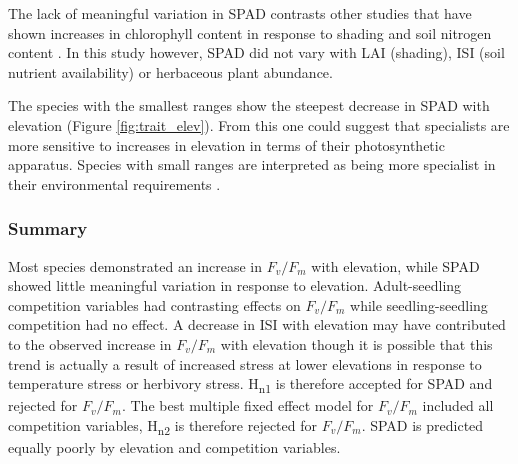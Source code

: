 \documentclass[a4paper,11pt]{article}
\begin{document}
The lack of meaningful variation in SPAD contrasts other studies that have shown increases in chlorophyll content in response to shading \citep{Brand1997, Rijkers2000, Rozendaal2006, Dai2009, Zervoudakis2012} and soil nitrogen content \citep{Cechin2004}. In this study however, SPAD did not vary with LAI (shading), ISI (soil nutrient availability) or herbaceous plant abundance. 

The species with the smallest ranges show the steepest decrease in SPAD with elevation (Figure \ref{fig:trait_elev}). From this one could suggest that specialists are more sensitive to increases in elevation in terms of their photosynthetic apparatus. Species with small ranges are interpreted as being more specialist in their environmental requirements \citep{Thuiller2005}.

\subsubsection*{Summary}
Most species demonstrated an increase in $F_v/F_m$ with elevation, while SPAD showed little meaningful variation in response to elevation. Adult-seedling competition variables had contrasting effects on $F_v/F_m$ while seedling-seedling competition had no effect. A decrease in ISI with elevation may have contributed to the observed increase in $F_v/F_m$ with elevation though it is possible that this trend is actually a result of increased stress at lower elevations in response to temperature stress or herbivory stress. H\textsubscript{n1} is therefore accepted for SPAD and rejected for $F_v/F_m$. The best multiple fixed effect model for $F_v/F_m$ included all competition variables, H\textsubscript{n2} is therefore rejected for $F_v/F_m$. SPAD is predicted equally poorly by elevation and competition variables.
\end{document}
